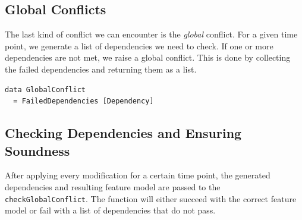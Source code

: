 \documentclass[a4paper,english]{ifimaster}
\begin{document}
\subsection{Global Conflicts}%
\label{sub:global_conflicts}

The last kind of conflict we can encounter is the \textit{global} conflict. For a given time point, we generate a list of dependencies we need to check. If one or more dependencies are not met, we raise a global conflict. This is done by collecting the failed dependencies and returning them as a list.

\begin{verbatim}
data GlobalConflict
  = FailedDependencies [Dependency]
\end{verbatim}

\subsection{Checking Dependencies and Ensuring Soundness}%
\label{sub:checking_dependencies_and_ensuring_soundness}

After applying every modification for a certain time point, the generated dependencies and resulting feature model are passed to the \texttt{check\-Global\-Conflict}. The function will either succeed with the correct feature model or fail with a list of dependencies that do not pass.
\end{document}
